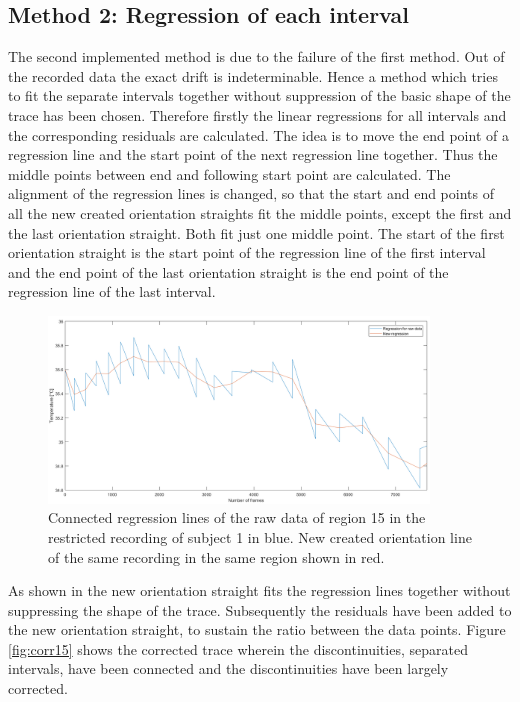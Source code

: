 \subsection{Method 2: Regression of each interval}

The second implemented method is due to the failure of the first method. Out of the recorded data the exact drift is indeterminable. Hence a method which tries to fit the separate intervals together without suppression of the basic shape of the trace has been chosen.
Therefore firstly the linear regressions for all intervals and the corresponding residuals are calculated.
The idea is to move the end point of a regression line and the start point of the next regression line together. Thus the middle points between end and following start point are calculated. The alignment of the regression lines is changed, so that the start and end points of all the new created orientation straights fit the middle points, except the first and the last orientation straight. Both fit just one middle point. The start of the first orientation straight is the start point of the regression line of the first interval and the end point of the last orientation straight is the end point of the regression line of the last interval.
\begin{figure}[H]
	\includegraphics[width=0.9\textwidth]{figures/reg15}
	\caption{Connected regression lines of the raw data of region 15 in the restricted recording of subject 1 in blue. New created orientation line of the same recording in the same region shown in red.}
	\label{fig:reg15}
\end{figure}
As shown in  the new orientation straight fits the regression lines together without suppressing the shape of the trace. Subsequently the residuals have been added to the new orientation straight, to sustain the ratio between the data points. Figure \ref{fig:corr15} shows the corrected trace wherein the discontinuities, separated intervals, have been connected and the discontinuities have been largely corrected.
